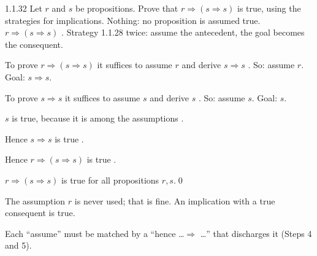 \begin{bookex}[essential]{1.1.32}
Let $r$ and $s$ be propositions. Prove that $r\Rightarrow(s\Rightarrow s)$ is true, using the strategies for implications.
\solution
\given Nothing: no proposition is assumed true.
\goal $r\Rightarrow(s\Rightarrow s)$ .
\plan Strategy 1.1.28 twice: assume the antecedent, the goal becomes the consequent.
\begin{steps}
\item To prove $r\Rightarrow(s\Rightarrow s)$ it suffices to assume $r$ and derive $s\Rightarrow s$ . So: assume $r$. Goal: $s\Rightarrow s$.
\item To prove $s\Rightarrow s$ it suffices to assume $s$ and derive $s$ . So: assume $s$. Goal: $s$.
\item $s$ is true, because it is among the assumptions .
\item Hence $s\Rightarrow s$ is true .
\item Hence $r\Rightarrow(s\Rightarrow s)$ is true .
\end{steps}
\conclusion $r\Rightarrow(s\Rightarrow s)$ is true for all propositions $r,s$.\qed
\begin{compare}
\item The assumption $r$ is never used; that is fine. An implication with a true consequent is true.
\item Each ``assume'' must be matched by a ``hence \dots $\Rightarrow$ \dots'' that discharges it (Steps 4 and 5).
\end{compare}
\end{bookex}

